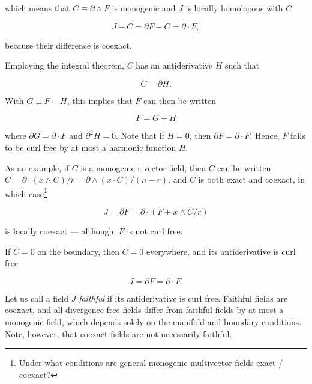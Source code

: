 \documentclass[twocolumn]{article}
\begin{document}
which means that $C \equiv \partial \wedge F$ is monogenic and $J$ is locally homologous with $C$

\begin{equation}
  J - C = \partial F - C = \partial \cdot F,\label{eq:homologous}
\end{equation}

because their difference is coexact.

Employing the integral theorem, $C$ has an antiderivative $H$ such that 

\begin{equation}
  C = \partial H.
\end{equation}

With $G \equiv F - H$, this implies that $F$ can then be written

\begin{equation}
  F = G + H\label{eq:harmonic-split}
\end{equation}

where $\partial G = \partial \cdot F$ and $\partial^2 H = 0$. Note that if $H=0$, then $\partial F = \partial \cdot F$. Hence, $F$ fails to be curl free by at most a harmonic function $H$.

As an example, if $C$ is a monogenic r-vector field, then $C$ can be written $C = \partial \cdot (x \wedge C)/r = \partial \wedge (x \cdot C)/(n-r)$, and $C$ is both exact and coexact, in which case\footnote{Under what conditions are general monogenic multivector fields exact / coexact?}

\begin{equation}
  J = \partial F = \partial \cdot (F + x \wedge C/r)\label{eq:unfaithful}
\end{equation}

is locally coexact --- although, $F$ is not curl free. 

If $C = 0$ on the boundary, then $C = 0$ everywhere, and its antiderivative is curl free

\begin{equation}
  J = \partial F = \partial \cdot F. \label{eq:faithful}
\end{equation}

Let us call a field $J$ \emph{faithful} if its antiderivative is curl free. Faithful fields are coexact, and all divergence free fields differ from faithful fields by at most a monogenic field, which depends solely on the manifold and boundary conditions. Note, however, that coexact fields are not necessarily faithful. 
\end{document}
